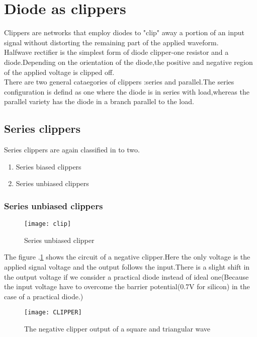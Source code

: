 \section{Diode as clippers} 
Clippers are networks that employ diodes to "clip" away a portion of an input signal without distorting the remaining part of the applied waveform.\\
Halfwave rectifier is the simplest form of diode clipper-one resistor and a diode.Depending on the orientation of the diode,the positive and negative region of the applied voltage is clipped off.\\
There are two general cataegories of clippers :series and parallel.The series configuration is defind as one where the diode is in series with load,whereas the parallel variety has the diode in a branch parallel to the load.
\subsection{Series clippers}
Series clippers are again classified in to two.
\begin{enumerate}
	\item Series biased clippers
	\item Series unbiased clippers
\end{enumerate}
\subsubsection{Series unbiased clippers}
\begin{figure}[H]
\centering
\texttt{[image: clip]}
\caption{Series unbiased clipper}
\label{Series unbiased clipper}
\end{figure} 
The figure .\ref{Series unbiased clipper} shows the circuit of a negative clipper.Here the only voltage is the applied signal voltage and the output follows the input.There is a slight shift in the output voltage if we consider a practical diode instead of ideal one(Because the input voltage have to overcome the barrier potential(0.7V for silicon) in the case of a practical diode.)
\begin{figure}[H]
\centering
\texttt{[image: CLIPPER]}
\caption{The negative clipper output of a square and triangular wave}
\label{}
\end{figure}
